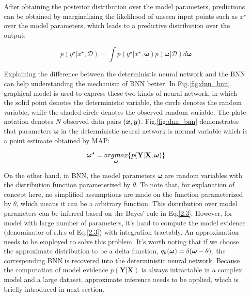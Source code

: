 After obtaining the posterior distribution over the model parameters, predictions can be obtained by marginalizing the likelihood of unseen input points such as $x^{\star}$ over the model parameters, which leads to a predictive distribution over the output:

\begin{equation}
p(y^{\star}|x^{\star}, \mathcal D) = \int p(y^{\star}|x^{\star}, \boldsymbol{\omega})p(\boldsymbol{\omega}|\mathcal D)d\boldsymbol{\omega}
\label{2.4}
\end{equation}

Explaining the difference between the deterministic neural network and the \gls{BNN} can help understanding the mechanism of \gls{BNN} better. In Fig.\ref{fig:dnn_bnn}, graphical model is used to express these two kinds of neural network, in which the solid point denotes the deterministic variable, the circle denotes the random variable, while the shaded circle denotes the observed random variable. The plate notation denotes $N$ observed data pairs $(\boldsymbol x, \boldsymbol y)$. Fig.\ref{fig:dnn_bnn} demonstrates that parameters $\boldsymbol{\omega}$ in the deterministic neural network is normal variable which is a point estimate obtained by MAP:

\begin{equation}
\boldsymbol{\omega^{\star}} = \underset{\boldsymbol \omega}{argmax}\{p(\mathbf{Y}|\mathbf{X}, \boldsymbol{\omega})\}\label{2.5}
\end{equation}

On the other hand, in \gls{BNN}, the model parameters $\boldsymbol{\omega}$ are random variables with the distribution function parameterized by $\theta$. To note that, for explanation of concept here, no simplified assumptions are made on the function parameterized by $\theta$, which means it can be a arbitrary function. This distribution over model parameters can be inferred based on the Bayes' rule in Eq.\ref{2.3}. However, for model with large number of parameters, it's hard to compute the model evidence (denominator of r.h.s of Eq.\ref{2.3}) with integration tractably. An approximation needs to be employed to solve this problem. It's worth noting that if we choose the approximate distribution to be  a delta function, $q_{\theta}(\boldsymbol \omega) = \delta(\boldsymbol \omega - \theta)$, the corresponding \gls{BNN} is recovered into the deterministic neural network. Because the computation of model evidence $p(\mathbf{Y}|\mathbf{X})$ is always intractable in a complex model and a large dataset, approximate inference needs to be applied, which is briefly introduced in next section.


